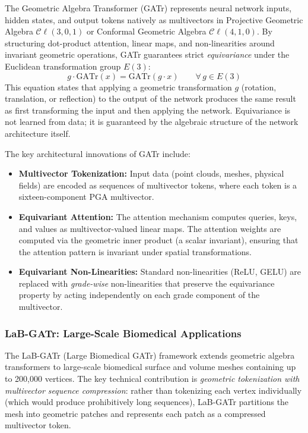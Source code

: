 \documentclass[manuscript, nonacm, review=false]{acmart}
\theoremstyle{definition}
\theoremstyle{plain}
\newcommand{\Cl}{\mathcal{C}\!\ell}
\begin{document}
The Geometric Algebra Transformer (GATr) represents neural network inputs, hidden states, and output tokens natively as multivectors in Projective Geometric Algebra $\Cl(3,0,1)$ or Conformal Geometric Algebra $\Cl(4,1,0)$. By structuring dot-product attention, linear maps, and non-linearities around invariant geometric operations, GATr guarantees strict \emph{equivariance} under the Euclidean transformation group $E(3)$:
\begin{equation}
    g \cdot \text{GATr}(x) = \text{GATr}(g \cdot x) \qquad \forall\, g \in E(3)
    \label{eq:gatr_equivariance}
\end{equation}
This equation states that applying a geometric transformation $g$ (rotation, translation, or reflection) to the output of the network produces the same result as first transforming the input and then applying the network. Equivariance is not learned from data; it is guaranteed by the algebraic structure of the network architecture itself.

The key architectural innovations of GATr include:
\begin{itemize}
    \item \textbf{Multivector Tokenization:} Input data (point clouds, meshes, physical fields) are encoded as sequences of multivector tokens, where each token is a sixteen-component PGA multivector.
    
    \item \textbf{Equivariant Attention:} The attention mechanism computes queries, keys, and values as multivector-valued linear maps. The attention weights are computed via the geometric inner product (a scalar invariant), ensuring that the attention pattern is invariant under spatial transformations.
    
    \item \textbf{Equivariant Non-Linearities:} Standard non-linearities (ReLU, GELU) are replaced with \emph{grade-wise} non-linearities that preserve the equivariance property by acting independently on each grade component of the multivector.
\end{itemize}

\subsubsection{LaB-GATr: Large-Scale Biomedical Applications}

The LaB-GATr (Large Biomedical GATr) framework extends geometric algebra transformers to large-scale biomedical surface and volume meshes containing up to 200,000 vertices. The key technical contribution is \emph{geometric tokenization with multivector sequence compression}: rather than tokenizing each vertex individually (which would produce prohibitively long sequences), LaB-GATr partitions the mesh into geometric patches and represents each patch as a compressed multivector token.
\end{document}
